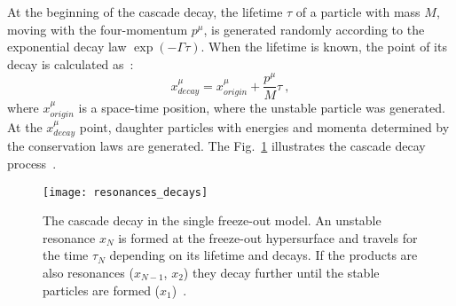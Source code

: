       At the beginning of the cascade decay, the lifetime $\tau$ of a particle with mass $M$, moving with the four-momentum $p^\mu$, is generated randomly according to the exponential decay law $\exp(-\Gamma\tau)$.
      When the lifetime is known, the point of its decay is calculated as~\cite{therminator}:
      \begin{equation}
        x^\mu_{decay} = x^\mu_{origin} + \frac{p^\mu}{M}\tau~,
      \end{equation}
      where $x^\mu_{origin}$ is a space-time position, where the unstable particle was generated.
      At the $x^\mu_{decay}$ point, daughter particles with energies and momenta determined by the conservation laws are generated.
      The Fig.~\ref{fig:resonances-decay} illustrates the cascade decay process~\cite{therminator}.
      \begin{figure}[h]
        \centering
        \texttt{[image: resonances\_decays]}
        \caption{The cascade decay in the single freeze-out model. An unstable resonance $x_N$ is formed at the freeze-out hypersurface and travels for the time $\tau_N$ depending on its lifetime and decays. If the products are also resonances ($x_{N-1}$, $x_2$) they decay further until the stable particles are formed ($x_1$)~\cite{therminator}.}
        \label{fig:resonances-decay}
      \end{figure}